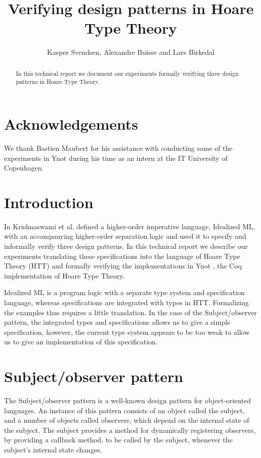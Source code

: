 \documentclass[a4paper,english]{article}
\title{Verifying design patterns in Hoare Type Theory}
\author{Kasper Svendsen, Alexandre Buisse and Lars Birkedal}
\begin{document}
\makefront 
\maketitle

\begin{abstract}
In this technical report we document our experiments formally verifying three
design patterns in Hoare Type Theory.
\end{abstract}

\section*{Acknowledgements}

We thank Bastien Maubert for his assistance with conducting some of the
experiments in Ynot during his time as an intern at the IT University of
Copenhagen.

\section{Introduction}

In \cite{patterns, subobj} Krishnaswami et al. defined a higher-order imperative
language, Idealized ML, with an accompanying higher-order separation logic and
used it to specify and informally verify three design patterns. In this
technical report we describe our experiments translating these specifications
into the language of Hoare Type Theory (HTT) and formally verifying the
implementations in Ynot \cite{ynot-conf}, the Coq implementation of Hoare
Type Theory.

Idealized ML is a program logic with a separate type system and specification
language, whereas specifications are integrated with types in HTT. Formalizing
the examples thus requires a little translation. In the case of the
Subject/observer pattern, the integrated types and specifications allows us to
give a simple specification, however, the current type system appears to be
too weak to allow us to give an implementation of this specification. 

\section{Subject/observer pattern}

The Subject/observer pattern is a well-known design pattern for object-oriented
languages. An instance of this pattern consists of an object called the
subject, and a number of objects called observers, which depend on the internal
state of the subject. The subject provides a method for dynamically registering
observers, by providing a callback method, to be called by the subject,
whenever the subject's internal state changes.
\end{document}
